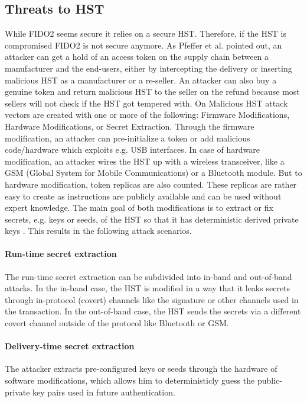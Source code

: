 \documentclass[runningheads]{llncs}
\begin{document}
\subsection{Threats to HST}
While FIDO2 seems secure it relies on a secure HST. Therefore, if the HST is compromised FIDO2 is not secure anymore. As Pfeffer et al. pointed out, an attacker can get a hold of an access token on the supply chain between a manufacturer and the end-users, either by intercepting the delivery or inserting malicious HST as a manufacturer or a re-seller. An attacker can also buy a genuine token and return malicious HST to the seller on the refund because most sellers will not check if the HST got tempered with. On Malicious HST attack vectors are created with one or more of the following: Firmware Modifications, Hardware Modifications, or Secret Extraction. Through the firmware modification, an attacker can pre-initialize a token or add malicious code/hardware which exploits e.g. USB interfaces. In case of hardware modification, an attacker wires the HST up with a wireless transceiver, like a GSM (Global System for Mobile Communications) or a Bluetooth module. But to hardware modification, token replicas are also counted. These replicas are rather easy to create as instructions are publicly available and can be used without expert knowledge. The main goal of both modifications is to extract or fix secrets, e.g. keys or seeds, of the HST so that it has deterministic derived private keys \cite{272198}. This results in the following attack scenarios.

\paragraph{Run-time secret extraction}
The run-time secret extraction can be subdivided into in-band and out-of-band attacks. In the in-band case, the HST is modified in a way that it leaks secrets through in-protocol (covert) channels like the signature or other channels used in the transaction. In the out-of-band case, the HST sends the secrets via a different covert channel outside of the protocol like Bluetooth or GSM.

\paragraph{Delivery-time secret extraction}
The attacker extracts pre-configured keys or seeds through the hardware of software modifications, which allows him to deterministicly guess the public-private key pairs used in future authentication.
\end{document}

